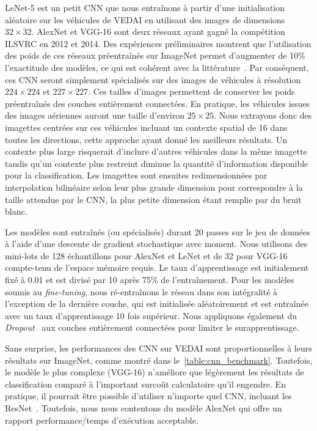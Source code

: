  LeNet-5 est un petit \gls{CNN} que nous entraînons à partir d'une initialisation aléatoire sur les véhicules de \gls{VEDAI} en utilisant des images de dimensions $32\times32$. \gls{AlexNet} et \gls{VGG-16} sont deux réseaux ayant gagné la compétition \gls{ILSVRC} en 2012 et 2014. Des expériences préliminaires montrent que l'utilisation des poids de ces réseaux préentraînés sur ImageNet permet d'augmenter de 10\% l'exactitude des modèles, ce qui est cohérent avec la littérature~\cite{nogueira_towards_2016,penatti_deep_2015}. Par conséquent, ces \gls{CNN} seront simplement spécialisés sur des images de véhicules à résolution $224 \times 224$ et $227 \times 227$.
 Ces tailles d'images permettent de conserver les poids préentraînés des couches entièrement connectées. En pratique, les véhicules issues des images aériennes auront une taille d'environ $25\times 25$. Nous extrayons donc des imagettes centrées sur ces véhicules incluant un contexte spatial de \SI{16}{\px} dans toutes les directions, cette approche ayant donné les meilleurs résultats. Un contexte plus large risquerait d'inclure d'autres véhicules dans la même imagette tandis qu'un contexte plus restreint diminue la quantité d'information disponible pour la classification. Les imagettes sont ensuites redimensionnées par interpolation bilinéaire selon leur plus grande dimension pour correspondre à la taille attendue par le \gls{CNN}, la plus petite dimension étant remplie par du bruit blanc.

Les modèles sont entraînés (ou spécialisés) durant 20 passes sur le jeu de données à l'aide d'une descente de gradient stochastique avec moment. Nous utilisons des mini-lots de 128 échantillons pour AlexNet et LeNet et de 32 pour VGG-16 compte-tenu de l'espace mémoire requis. Le taux d'apprentissage est initialement fixé à 0.01 et est divisé par 10 après 75\% de l'entraînement. Pour les modèles soumis au \emph{fine-tuning}, nous ré-entraînons le réseau dans son intégralité à l'exception de la dernière couche, qui est initialisée aléatoirement et est entraînée avec un taux d'apprentissage 10 fois supérieur. Nous appliquons également du \emph{Dropout}~\cite{srivastava_dropout_2014} aux couches entièrement connectées pour limiter le surapprentissage.

Sans surprise, les performances des \gls{CNN} sur \gls{VEDAI} sont proportionnelles à leurs résultats sur ImageNet, comme montré dans le~\cref{table:cnn_benchmark}. Toutefois, le modèle le plus complexe (VGG-16) n'améliore que légèrement les résultats de classification comparé à l'important surcoût calculatoire qu'il engendre. En pratique, il pourrait être possible d'utiliser n'importe quel \gls{CNN}, incluant les ResNet~\cite{he_deep_2016}. Toutefois, nous nous contentons du modèle AlexNet qui offre un rapport performance/temps d'exécution acceptable.

